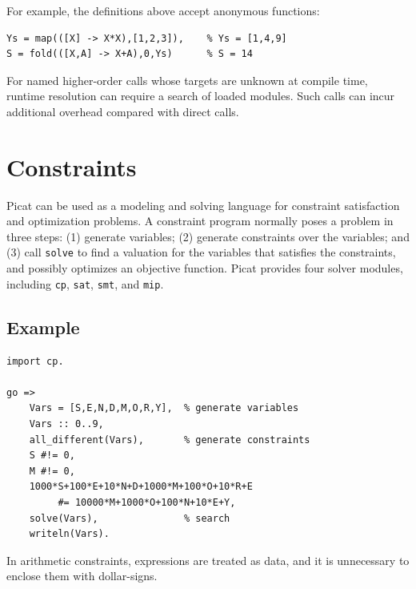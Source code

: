 For example, the definitions above accept anonymous functions:
\begin{verbatim}
Ys = map(([X] -> X*X),[1,2,3]),    % Ys = [1,4,9]
S = fold(([X,A] -> X+A),0,Ys)      % S = 14
\end{verbatim}

For named higher-order calls whose targets are unknown at compile time, runtime resolution can require a search of loaded modules. Such calls can incur additional overhead compared with direct calls.

\section{\label{section:Constraints}Constraints}
Picat can be used as a modeling and solving language for constraint satisfaction and optimization problems.  A constraint program normally poses a problem in three steps: (1) generate variables; (2) generate constraints over the variables; and (3) call \texttt{solve} to find a valuation for the variables that satisfies the constraints, and possibly optimizes an objective function. Picat provides four solver modules, including \texttt{cp}, \texttt{sat}, \texttt{smt}, and \texttt{mip}.

\subsection*{Example}
\begin{verbatim}
import cp.

go => 
    Vars = [S,E,N,D,M,O,R,Y],  % generate variables
    Vars :: 0..9,
    all_different(Vars),       % generate constraints
    S #!= 0,
    M #!= 0,
    1000*S+100*E+10*N+D+1000*M+100*O+10*R+E 
         #= 10000*M+1000*O+100*N+10*E+Y,
    solve(Vars),               % search
    writeln(Vars).
\end{verbatim}
In arithmetic constraints, expressions are treated as data, and it is unnecessary to enclose them with dollar-signs.


